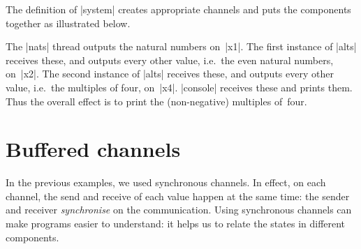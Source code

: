 The definition of |system| creates appropriate channels and puts the
components together as illustrated below.
%
\begin{center}
\end{center}
%
The |nats| thread outputs the natural numbers on~|x1|.  The first instance of
|alts| receives these, and outputs every other value, i.e.~the even natural
numbers, on~|x2|.  The second instance of |alts| receives these, and outputs
every other value, i.e.~the multiples of four, on~|x4|.  |console| receives
these and prints them.  Thus the overall effect is to print the (non-negative)
multiples of~four.


\section{Buffered channels}

In the previous examples, we used synchronous channels.  In effect, on each
channel, the send and receive of each value happen at the same time: the
sender and receiver \emph{synchronise} on the communication.
%
Using synchronous channels can make programs easier to understand: it helps us
to relate the states in different components.

